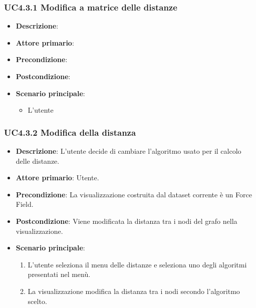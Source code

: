 \subsubsection{UC4.3.1 Modifica a matrice delle distanze}
\label{ssub:uc4.3.1}
\begin{itemize}
    \item \textbf{Descrizione}:
    \item \textbf{Attore primario}:
    \item \textbf{Precondizione}:
    \item \textbf{Postcondizione}:
    \item \textbf{Scenario principale}:
    \begin{itemize}
        \item L'utente
    \end{itemize}
\end{itemize}

\subsubsection{UC4.3.2 Modifica della distanza}
\label{subsec:uc4.3.2}
\begin{itemize}
    \item \textbf{Descrizione}: L’utente decide di cambiare l’algoritmo usato per il calcolo delle distanze.

	
    \item \textbf{Attore primario}: Utente.
    
    \item \textbf{Precondizione}:   La visualizzazione costruita dal dataset corrente è un Force Field.
    \item \textbf{Postcondizione}:  Viene modificata la distanza tra i nodi del grafo nella visualizzazione.

	\item \textbf{Scenario principale}:
        \begin{enumerate}
            \item L'utente seleziona il menu delle distanze e seleziona uno degli algoritmi presentati nel menù.
            \item La visualizzazione modifica la distanza tra i nodi secondo l'algoritmo scelto.
        \end{enumerate}
\end{itemize}


